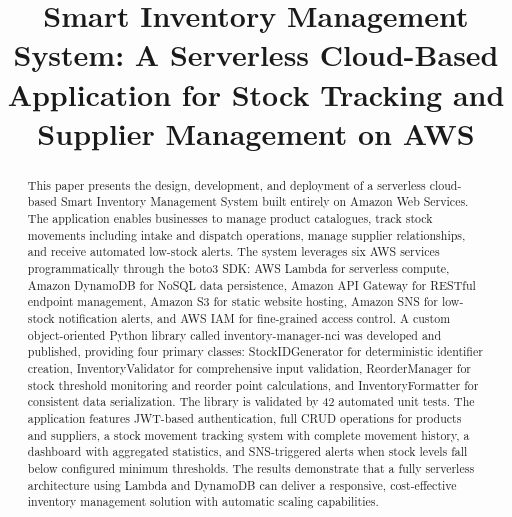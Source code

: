 \documentclass[conference]{IEEEtran}
\begin{document}
\title{Smart Inventory Management System: A Serverless Cloud-Based Application for Stock Tracking and Supplier Management on AWS}

\author{
}

\maketitle

\begin{abstract}
This paper presents the design, development, and deployment of a serverless cloud-based Smart Inventory Management System built entirely on Amazon Web Services. The application enables businesses to manage product catalogues, track stock movements including intake and dispatch operations, manage supplier relationships, and receive automated low-stock alerts. The system leverages six AWS services programmatically through the boto3 SDK: AWS Lambda for serverless compute, Amazon DynamoDB for NoSQL data persistence, Amazon API Gateway for RESTful endpoint management, Amazon S3 for static website hosting, Amazon SNS for low-stock notification alerts, and AWS IAM for fine-grained access control. A custom object-oriented Python library called inventory-manager-nci was developed and published, providing four primary classes: StockIDGenerator for deterministic identifier creation, InventoryValidator for comprehensive input validation, ReorderManager for stock threshold monitoring and reorder point calculations, and InventoryFormatter for consistent data serialization. The library is validated by 42 automated unit tests. The application features JWT-based authentication, full CRUD operations for products and suppliers, a stock movement tracking system with complete movement history, a dashboard with aggregated statistics, and SNS-triggered alerts when stock levels fall below configured minimum thresholds. The results demonstrate that a fully serverless architecture using Lambda and DynamoDB can deliver a responsive, cost-effective inventory management solution with automatic scaling capabilities.
\end{abstract}
\end{document}
